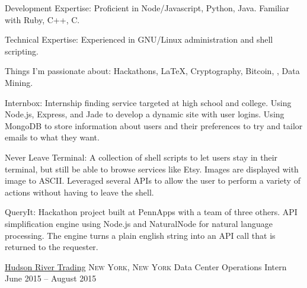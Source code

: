 \documentclass[11pt]{article}
\begin{document}
\inlineheadsection  %
  {Development Expertise:}
  { Proficient in Node/Javascript, Python, Java.  Familiar with Ruby, C++, C.}


\inlineheadsection
  {Technical Expertise:}
  { Experienced in GNU/Linux administration and shell scripting. }

\inlineheadsection
  {Things I'm passionate about:}
  {Hackathons, \LaTeX, Cryptography, Bitcoin, , Data Mining.}


\spacedhrule{0.1em}{0.9em}  %

\inlineheadsection  %
  {Internbox:}
  { Internship finding service targeted at high school and college.  Using Node.js, Express, and Jade to develop a dynamic site with user logins.  Using MongoDB to store information about users and their preferences to try and tailor emails to what they want. }

\inlineheadsection
	{Never Leave Terminal:}
	{ A collection of shell scripts to let users stay in their terminal, but still be able to browse services like Etsy.  Images are displayed with image to ASCII.  Leveraged several APIs to allow the user to perform a variety of actions without having to leave the shell. }

\inlineheadsection
  {QueryIt:}
  { Hackathon project built at PennApps with a team of three others.  API simplification engine using Node.js and NaturalNode for natural language processing.  The engine turns a plain english string into an API call that is returned to the requester. }

\vspace{0.5em}


\spacedhrule{0.1em}{0.9em}  %


\headedsection  %
{\href{http://www.hudson-trading.com/}{Hudson River Trading}}
{\textsc{New York, New York}} {
	\headedsubsection
	{Data Center Operations Intern}
	{June 2015 -- August 2015}
	{
	}
}
\end{document}
